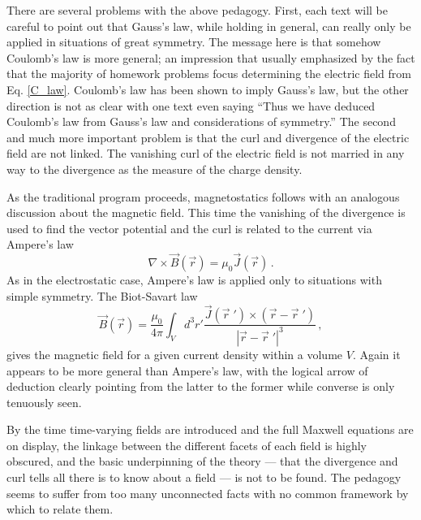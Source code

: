 \documentclass{article}
\begin{document}
There are several problems with the above pedagogy.  First, each text will be careful to point out that 
Gauss's law, while holding in general, can really only be applied in situations of great symmetry.  The message 
here is that somehow Coulomb's law is more general; an impression that usually emphasized by the fact that the 
majority of homework problems focus determining the electric field from Eq. \ref{C_law}.  Coulomb's 
law has been shown to imply Gauss's law, but the other direction is not as clear with one text even saying ``Thus 
we have deduced Coulomb's law from Gauss's law and considerations of symmetry.'' \cite{Halliday} The second and much more 
important problem is that the curl and divergence of the electric field are not linked.  The vanishing curl of 
the electric field is not married in any way to the divergence as the measure of the charge density.  

As the traditional program proceeds, magnetostatics follows with an analogous discussion about the magnetic field. 
This time the vanishing of the divergence is used to find the vector potential and the curl is 
related to the current via Ampere's law
\begin{equation}
  \nabla \times \vec B(\vec r) = \mu_0 \vec J(\vec r) \,.
\end{equation}
As in the electrostatic case, Ampere's law is applied only to situations with simple symmetry.  The Biot-Savart law 
\begin{equation}\label{B_law}
\vec B(\vec r) = \frac{\mu_0}{4 \pi}   \int_V d^3 r' \frac{ \vec J(\vec r \; ') \times (\vec r - \vec r \;')}{|\vec r - \vec r \; '|^3} \, ,
\end{equation}
gives the magnetic field for a given current density within a volume $V$.  Again it appears to be more general 
than Ampere's law, with the logical arrow of deduction clearly pointing from the latter to the former while converse 
is only tenuously seen.  

By the time time-varying fields are introduced and the full Maxwell equations are on display, the linkage between the 
different facets of each field is highly obscured, and the basic underpinning of the theory --- that the divergence and 
curl tells all there is to know about a field --- is not to be found. The pedagogy seems to suffer from too many unconnected 
facts with no common framework by which to relate them.
\end{document}
